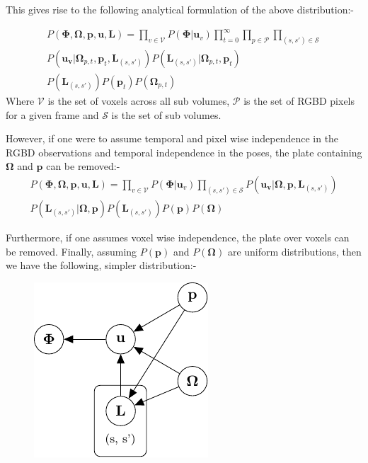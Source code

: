This gives rise to the following analytical formulation of the above distribution:-

\begin{equation}
\begin{split}
P(\mathbf{\Phi}, \mathbf{\Omega}, \mathbf{p}, \mathbf{u}, \mathbf{L}) = 
\prod_{v \in \mathcal{V}}P(\mathbf{\Phi}|\mathbf{u}_{v}) 
\prod_{t=0}^{\infty}\prod_{p \in \mathcal{P}}\prod_{(s, s') \in \mathcal{S}}\\
P(\mathbf{u_{v}}|\mathbf{\Omega}_{p, t}, \mathbf{p}_{t}, \mathbf{L}_{(s, s')})
P(\mathbf{L}_{(s, s')}|\mathbf{\Omega}_{p, t}, \mathbf{p}_{t})\\
P(\mathbf{L}_{(s, s')})P(\mathbf{p}_{t})P(\mathbf{\Omega}_{p, t})
\end{split}
\end{equation}
Where $\mathcal{V}$ is the set of voxels across all sub volumes, $\mathcal{P}$ is the set of RGBD pixels for a given 
frame and $\mathcal{S}$ is the set of sub volumes.

However, if one were to assume temporal and pixel wise independence in the RGBD observations and temporal independence in 
the poses, the plate containing $\mathbf{\Omega}$ and $\mathbf{p}$ can be removed:-
\begin{equation}
\begin{split}
P(\mathbf{\Phi}, \mathbf{\Omega}, \mathbf{p}, \mathbf{u}, \mathbf{L}) = 
\prod_{v \in \mathcal{V}}P(\mathbf{\Phi}|\mathbf{u}_{v})
\prod_{(s, s') \in \mathcal{S}}P(\mathbf{u_{v}}|\mathbf{\Omega}, \mathbf{p}, \mathbf{L}_{(s, s')})\\
P(\mathbf{L}_{(s, s')}|\mathbf{\Omega}, \mathbf{p}) P(\mathbf{L}_{(s, s')})P(\mathbf{p})P(\mathbf{\Omega})
\end{split}
\end{equation}

Furthermore, if one assumes voxel wise independence, the plate over voxels can be removed. Finally, assuming $P(\mathbf{p})$ and 
$P(\mathbf{\Omega})$ are uniform distributions, then we have the following, simpler distribution:-
\begin{figure}[h]
	\centering
	\includegraphics{graphical_models/pgm2.pdf}
\end{figure}

